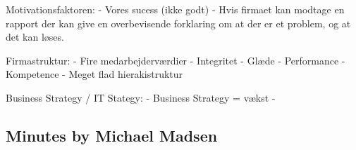 Motivationsfaktoren:
	- Vores sucess (ikke godt)
	- Hvis firmaet kan modtage en rapport der kan give en overbevisende forklaring om at der er et problem, og at det kan løses.


Firmastruktur:
	- Fire medarbejderværdier
		- Integritet
		- Glæde
		- Performance
		- Kompetence
	- Meget flad hierakistruktur


Business Strategy / IT Stategy:
	- Business Strategy = vækst
	- 

\subsection{Minutes by Michael Madsen}

